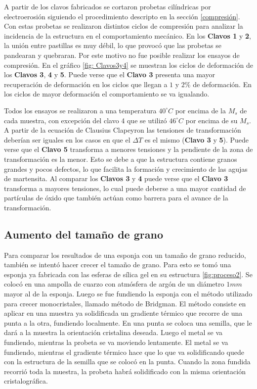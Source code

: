 \documentclass[a4paper,12pt,fleqn,twoside,openany]{book}
\begin{document}
A partir de los clavos fabricados se cortaron probetas cilíndricas por electroerosión siguiendo el procedimiento descripto en la sección \ref{compresión}. Con estas probetas se realizaron distintos ciclos de compresión para analizar la incidencia de la estructura en el comportamiento mecánico. En los \textbf{Clavos 1} y \textbf{2}, la unión entre pastillas es muy débil, lo que provocó que las probetas se pandearan y quebraran. Por este motivo no fue posible realizar los ensayos de compresión. En el gráfico \ref{fig: Clavos3y4} se muestran los ciclos de deformación de los \textbf{Clavos 3}, \textbf{4} y \textbf{5}. Puede verse que el \textbf{Clavo 3} presenta una mayor recuperación de deformación en los ciclos que llegan a $1$ y $2 \%$ de deformación. En los ciclos de mayor deformación el comportamiento se va igualando.

Todos los ensayos se realizaron a una temperatura $40^\circ C$ por encima de la $M_s$ de cada muestra, con excepción del clavo 4 que se utilizó $46^\circ C$ por encima de su $M_s$. A partir de la ecuación de Clausius Clapeyron las tensiones de transformación deberían ser iguales en los casos en que el $\Delta T$ es el mismo (\textbf{Clavo 3} y \textbf{5}). Puede verse que el \textbf{Clavo 5} transforma a menores tensiones y la pendiente de la zona de transformación es la menor. Esto se debe a que la estructura contiene granos grandes y pocos defectos, lo que facilita la formación y crecimiento de las agujas de martensita. Al comparar los \textbf{Clavos 3} y \textbf{4} puede verse que el \textbf{Clavo 3} transforma a mayores tensiones, lo cual puede deberse a una mayor cantidad de partículas de óxido que también actúan como barrera para el avance de la transformación.  



\subsection{Aumento del tamaño de grano}

Para comparar los resultados de una esponja con un tamaño de grano reducido, también se intentó hacer crecer el tamaño de grano. Para esto se tomó una esponja ya fabricada con las esferas de sílica gel en su estructura \ref{fig:proceso2}. Se colocó en una ampolla de cuarzo con atmósfera de argón de un diámetro  $1 mm$ mayor al de la esponja. Luego se fue fundiendo la esponja con el método utilizado para crecer monocristales, llamado método de Bridgman. El método consiste en aplicar en una muestra ya solidificada un gradiente térmico que recorre de una punta a la otra, fundiendo localmente. En una punta se coloca una semilla, que le dará a la muestra la orientación cristalina deseada. Luego el metal se va fundiendo, mientras la probeta se va moviendo lentamente. El metal se va fundiendo, mientras el gradiente térmico hace que lo que va solidificando quede con la estructura de la semilla que se colocó en la punta. Cuando la zona fundida recorrió toda la muestra, la probeta habrá solidificado con la misma orientación cristalográfica.
\end{document}
